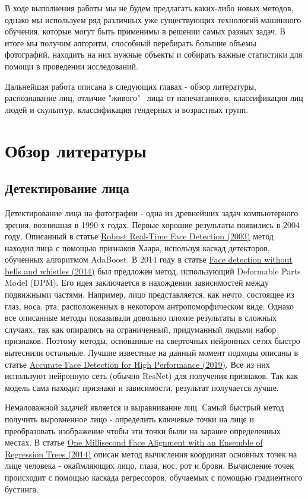 \documentclass[a4paper,14pt]{extarticle}
\newcommand{\bibref}[3]{\hyperlink{#1}{#2 (#3)}} %
\begin{document}
    \par В ходе выполнения работы мы не будем предлагать каких-либо новых методов, однако мы используем ряд различных уже существующих технологий машинного обучения, которые могут быть применимы в решении самых разных задач. В итоге мы получим алгоритм, способный перебирать большие объемы фотографий, находить на них нужные объекты и собирать важные статистики для помощи в проведении исследований.
    \par Дальнейшая работа описана в следующих главах - обзор литературы, распознавание лиц, отличие "живого" \, лица от напечатанного, классификация лиц людей и скульптур, классификация гендерных и возрастных групп.
    \newpage

    \section{Обзор литературы}
    \subsection{Детектирование лица}
    Детектирование лица на фотографии - одна из древнейших задач компьютерного зрения, возникшая в 1990-х годах. Первые хорошие результаты появились в 2004 году. Описанный в статье \bibref{face_detection}{Robust Real-Time Face Detection}{2003} метод находил лица с помощью признаков Хаара, используя каскад детекторов, обученных алгоритмом AdaBoost. В 2014 году в статье \bibref{face_detection2}{Face detection without bells and whistles}{2014} был предложен метод, использующий Deformable Parts Model (DPM). Его идея заключается в нахождении зависимостей между подвижными частями. Например, лицо представляется, как нечто, состоящее из глаз, носа, рта, расположенных в некотором антропоморфическом виде. Однако все описанные методы показывали довольно плохие результаты в сложных случаях, так как опирались на ограниченный, придуманный людьми набор признаков. Поэтому методы, основанные на сверточных нейронных сетях быстро вытеснили остальные. Лучшие известные на данный момент подходы описаны в статье \bibref{face_detection3}{Accurate Face Detection for High Performance}{2019}. Все из них используют нейронную сеть (обычно ResNet) для получения признаков. Так как модель сама находит признаки и зависимости, результат получается лучше.
    \par Немаловажной задачей является и выравнивание лиц. Самый быстрый метод получить выровненное лицо - определить ключевые точки на лице и преобразовать изображение чтобы эти точки были на заранее определенных местах. В статье \bibref{align}{One Millisecond Face Alignment with an Ensemble of Regression Trees}{2014} описан метод вычисления координат основных точек на лице человека - окаймляющих лицо, глаза, нос, рот и брови. Вычисление точек происходит с помощью каскада регрессоров, обучаемых с помощью градиентного бустинга.
\end{document}
